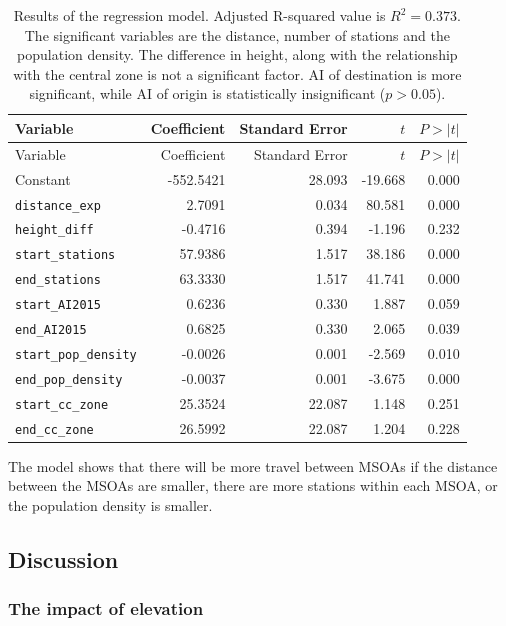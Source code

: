 \documentclass[
  a4paper,
  DIV=11,
  numbers=noendperiod]{scrartcl}
\begin{document}
\begin{longtable}[]{@{}lrrrr@{}}
\caption{Results of the regression model. Adjusted R-squared value is
\(R^2 = 0.373\). The significant variables are the distance, number of
stations and the population density. The difference in height, along
with the relationship with the central zone is not a significant factor.
AI of destination is more significant, while AI of origin is
statistically insignificant (\(p > 0.05\)).}\tabularnewline
\toprule\noalign{}
Variable & Coefficient & Standard Error & \(t\) & \(P > |t|\) \\
\midrule\noalign{}
\endfirsthead
\toprule\noalign{}
Variable & Coefficient & Standard Error & \(t\) & \(P > |t|\) \\
\midrule\noalign{}
\endhead
\bottomrule\noalign{}
\endlastfoot
Constant & -552.5421 & 28.093 & -19.668 & 0.000 \\
\texttt{distance\_exp} & 2.7091 & 0.034 & 80.581 & 0.000 \\
\texttt{height\_diff} & -0.4716 & 0.394 & -1.196 & 0.232 \\
\texttt{start\_stations} & 57.9386 & 1.517 & 38.186 & 0.000 \\
\texttt{end\_stations} & 63.3330 & 1.517 & 41.741 & 0.000 \\
\texttt{start\_AI2015} & 0.6236 & 0.330 & 1.887 & 0.059 \\
\texttt{end\_AI2015} & 0.6825 & 0.330 & 2.065 & 0.039 \\
\texttt{start\_pop\_density} & -0.0026 & 0.001 & -2.569 & 0.010 \\
\texttt{end\_pop\_density} & -0.0037 & 0.001 & -3.675 & 0.000 \\
\texttt{start\_cc\_zone} & 25.3524 & 22.087 & 1.148 & 0.251 \\
\texttt{end\_cc\_zone} & 26.5992 & 22.087 & 1.204 & 0.228 \\
\end{longtable}

The model shows that there will be more travel between MSOAs if the
distance between the MSOAs are smaller, there are more stations within
each MSOA, or the population density is smaller.

\hypertarget{discussion}{%
\subsection{Discussion}\label{discussion}}

\hypertarget{the-impact-of-elevation}{%
\subsubsection{The impact of elevation}\label{the-impact-of-elevation}}
\end{document}
